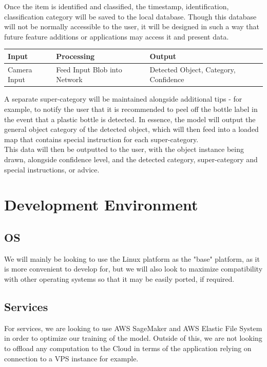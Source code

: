 \documentclass[conference]{IEEEtran}
\begin{document}
Once the item is identified and classified, the timestamp, identification, classification category will be saved to the local database. Though this database will not be normally accessible to the user, it will be designed in such a way that future feature additions or applications may access it and present data.

\begin{table}[htbp]
    \begin{tabular}{|p{2cm}|p{2.9cm}|p{2.9cm}|}
    \hline
    \textbf{Input} & \textbf{Processing} & \textbf{Output}\\ \hline
    Camera Input & Feed Input Blob into Network & Detected Object, Category, Confidence \\ \hline
    \end{tabular}
\end{table}

A separate super-category will be maintained alongside additional tips - for example, to notify the user that it is recommended to peel off the bottle label in the event that a plastic bottle is detected. In essence, the model will output the general object category of the detected object, which will then feed into a loaded map that contains special instruction for each super-category.\\

This data will then be outputted to the user, with the object instance being drawn, alongside confidence level, and the detected category, super-category and special instructions, or advice.

\newpage
\section{Development Environment}
\subsection{OS}
We will mainly be looking to use the Linux platform as the "base" platform, as it is more convenient to develop for, but we will also look to maximize compatibility with other operating systems so that it may be easily ported, if required.
\newline
\subsection{Services}
For services, we are looking to use AWS SageMaker and AWS Elastic File System in order to optimize our training of the model. Outside of this, we are not looking to offload any computation to the Cloud in terms of the application relying on connection to a VPS instance for example.
\newline
\end{document}
